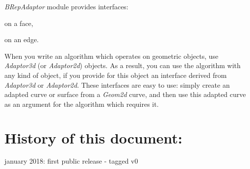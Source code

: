 {\itshape B\+Rep\+Adaptor} module provides interfaces\+:
\begin{DoxyItemize}
\item on a face,
\item on an edge.
\end{DoxyItemize}

When you write an algorithm which operates on geometric objects, use {\itshape Adaptor3d} (or {\itshape Adaptor2d}) objects. As a result, you can use the algorithm with any kind of object, if you provide for this object an interface derived from {\itshape Adaptor3d} or {\itshape Adaptor2d}. These interfaces are easy to use\+: simply create an adapted curve or surface from a {\itshape Geom2d} curve, and then use this adapted curve as an argument for the algorithm which requires it.\hypertarget{occt_user_guides__modeling_data_occt_modat_history}{}\section{History of this document\+:}\label{occt_user_guides__modeling_data_occt_modat_history}
january 2018\+: first public release -\/ tagged v0 
